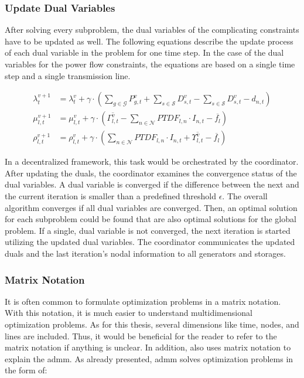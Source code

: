 \subsubsection*{Update Dual Variables}

After solving every subproblem, the dual variables of the complicating constraints have to be updated as well. The following equations describe the update process of each dual variable in the problem for one time step. In the case of the dual variables for the power flow constraints, the equations are based on a single time step and a single transmission line.

\begin{subequations}
	\begin{align}
		\lambda_t^{v+1} &= \lambda_t^{v} + \gamma \cdot (\sum_{g\in\mathcal{G}}P_{g,t}^{v} + \sum_{s\in\mathcal{S}}D_{s,t}^{v} - \sum_{s\in\mathcal{S}}D_{s,t}^{v} - d_{n,t}) \label{eq:update-duals:lambda} \\
		\mu_{l,t}^{v+1} &= \mu_{l,t}^{v} + \gamma \cdot (\overline{\Gamma_{l,t}^v} - \sum_{n \in \mathcal{N}} PTDF_{l,n} \cdot I_{n,t} - \overline{f_l}) \label{eq:update-duals:mu} \\
		\rho_{l,t}^{v+1} &= \rho_{l,t}^{v} + \gamma \cdot (\sum_{n \in \mathcal{N}} PTDF_{l,n} \cdot I_{n,t} + \overline{\Upsilon_{l,t}^v} - \overline{f_l})
	\end{align}
\end{subequations}

In a decentralized framework, this task would be orchestrated by the coordinator. After updating the duals, the coordinator examines the convergence status of the dual variables. A dual variable is converged if the difference between the next and the current iteration is smaller than a predefined threshold $\epsilon$. The overall algorithm converges if all dual variables are converged. Then, an optimal solution for each subproblem could be found that are also optimal solutions for the global problem. If a single, dual variable is not converged, the next iteration is started utilizing the updated dual variables. The coordinator communicates the updated duals and the last iteration's nodal information to all generators and storages. 


\subsubsection{Matrix Notation}
\label{sec:app:matrix}

It is often common to formulate optimization problems in a matrix notation. With this notation, it is much easier to understand multidimensional optimization problems. As for this thesis, several dimensions like time, nodes, and lines are included. Thus, it would be beneficial for the reader to refer to the matrix notation if anything is unclear. In addition, \citet{boyd2010} also uses matrix notation to explain the \gls{admm}. As already presented, \gls{admm} solves optimization problems in the form of:

